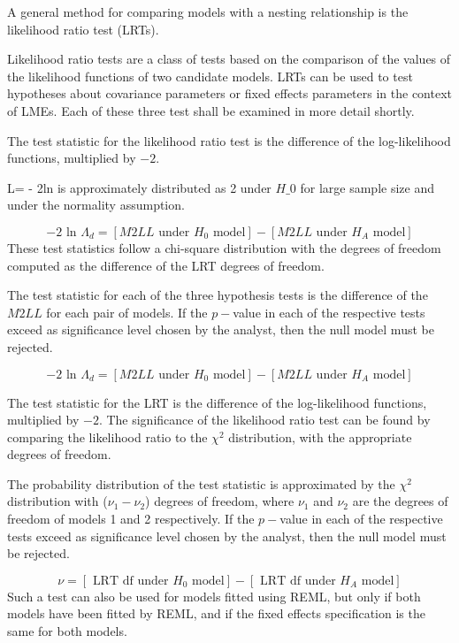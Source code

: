 \documentclass[12pt, a4paper]{report}
\theoremstyle{plain}
\theoremstyle{definition}
\theoremstyle{remark}
\begin{document}
	
	A general method for comparing models with a nesting relationship is the likelihood ratio test (LRTs). 
	
	
	Likelihood ratio tests are a class of tests based on the comparison of the values of the likelihood functions of two candidate models. LRTs can be used to test hypotheses about covariance parameters or fixed effects parameters in the context of LMEs.  Each of these three test shall be examined in more detail shortly.
	
	The test statistic for the likelihood ratio test is the difference of the log-likelihood functions, multiplied by $-2$.
	
	L= - 2ln is approximately distributed as 2 under $H\_0$ for large sample size and under the normality assumption.
	
	\begin{equation}
	-2\mbox{ ln }\Lambda_{d} =  [ M2LL \mbox{ under }H_{0} \mbox{ model}] - [ M2LL \mbox{ under }H_{A} \mbox{ model}]
	\end{equation}
	These test statistics follow a chi-square distribution with the degrees of freedom computed as the difference of the LRT degrees of freedom.
	
	The test statistic for each of the three hypothesis tests is the difference of the $M2LL$ for each pair of models. If the $p-$value in each of the respective tests exceed as significance level chosen by the analyst, then the null model must be rejected.
	
	\begin{equation}
	-2\mbox{ ln }\Lambda_{d} =  [ M2LL \mbox{ under }H_{0} \mbox{ model}] - [ M2LL \mbox{ under }H_{A} \mbox{ model}]
	\end{equation}
	
	The test statistic for the LRT is the difference of the log-likelihood functions, multiplied by $-2$.
	The significance of the likelihood ratio test can be found by comparing the likelihood ratio to the $\chi^2$ distribution, with the appropriate degrees of freedom.
	
	The probability distribution of the test statistic is approximated by the $\chi^2$ distribution with ($\nu_{1} - \nu_{2}$) degrees of freedom, where $\nu_{1}$ and $\nu_{2}$ are the degrees of freedom of models 1 and 2 respectively. If the $p-$value in each of the respective tests exceed as significance level chosen by the analyst, then the null model must be rejected.
	
	
	\begin{equation}
	\nu = [\mbox{ LRT df under }H_{0} \mbox{ model}] - [\mbox{ LRT df under }H_{A} \mbox{ model}]
	\end{equation}
	Such a test can also be used for models fitted using REML, but only if both models have been fitted by REML, and if the fixed effects specification is the same for both models.
	
\end{document}

